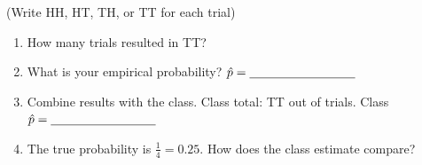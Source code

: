 \documentclass[10pt]{article}
\begin{document}
\begin{tcolorbox}[colback=goldbg, colframe=goldacc, boxrule=1pt, arc=2mm,
    left=4mm, right=4mm, top=3mm, bottom=3mm,
    title={\bfseries Tier R \enspace Remediate --- Run a Pre-Designed Simulation}]
\vspace{6pt}
(Write HH, HT, TH, or TT for each trial)

\begin{enumerate}[leftmargin=1.5em, itemsep=8pt]
  \item How many trials resulted in TT? \blank{2cm}
  \item What is your empirical probability? $\hat{p} = \blank{3cm}$
  \item Combine results with the class. Class total: \blank{2cm} TT out of \blank{2cm} trials.
        Class $\hat{p} = \blank{3cm}$
  \item The true probability is $\frac{1}{4} = 0.25$. How does the class estimate compare?\\
        \writeline
\end{enumerate}

\end{tcolorbox}

\vspace{0.1in}
\end{document}

